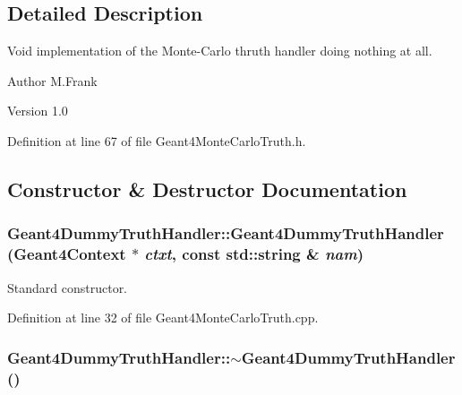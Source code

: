 \subsection{Detailed Description}
Void implementation of the Monte-\/Carlo thruth handler doing nothing at all. \begin{DoxyAuthor}{Author}
M.Frank 
\end{DoxyAuthor}
\begin{DoxyVersion}{Version}
1.0 
\end{DoxyVersion}


Definition at line 67 of file Geant4MonteCarloTruth.h.

\subsection{Constructor \& Destructor Documentation}
\hypertarget{class_d_d4hep_1_1_simulation_1_1_geant4_dummy_truth_handler_a5c401a9e0de83670c8e61da169bdd56e}{
\subsubsection[{Geant4DummyTruthHandler}]{\setlength{\rightskip}{0pt plus 5cm}Geant4DummyTruthHandler::Geant4DummyTruthHandler ({\bf Geant4Context} $\ast$ {\em ctxt}, \/  const std::string \& {\em nam})}}
\label{class_d_d4hep_1_1_simulation_1_1_geant4_dummy_truth_handler_a5c401a9e0de83670c8e61da169bdd56e}


Standard constructor. 

Definition at line 32 of file Geant4MonteCarloTruth.cpp.\hypertarget{class_d_d4hep_1_1_simulation_1_1_geant4_dummy_truth_handler_ae5c0fe10becfd6ba266b4bbb1b56c253}{
\subsubsection[{$\sim$Geant4DummyTruthHandler}]{\setlength{\rightskip}{0pt plus 5cm}Geant4DummyTruthHandler::$\sim$Geant4DummyTruthHandler ()}}
\label{class_d_d4hep_1_1_simulation_1_1_geant4_dummy_truth_handler_ae5c0fe10becfd6ba266b4bbb1b56c253}


